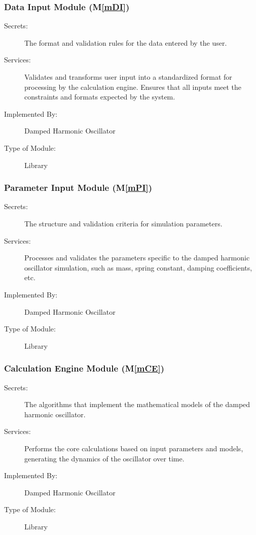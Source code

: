 \documentclass[12pt, titlepage]{article}
\newcommand{\mref}[1]{M\ref{#1}}
\begin{document}
\subsubsection{Data Input Module (\mref{mDI})}

\begin{description}
\item[Secrets:]The format and validation rules for the data entered by the user.
\item[Services:]Validates and transforms user input into a standardized format for processing by the calculation engine. Ensures that all inputs meet the constraints and formats expected by the system.
\item[Implemented By:] Damped Harmonic Oscillator
\item[Type of Module:] Library
\end{description}

\subsubsection{Parameter Input Module (\mref{mPI})}

\begin{description}
\item[Secrets:]The structure and validation criteria for simulation parameters.
\item[Services:]Processes and validates the parameters specific to the damped harmonic oscillator simulation, such as mass, spring constant, damping coefficients, etc.
\item[Implemented By:] Damped Harmonic Oscillator
\item[Type of Module:] Library
\end{description}

\subsubsection{Calculation Engine Module (\mref{mCE})}

\begin{description}
\item[Secrets:]The algorithms that implement the mathematical models of the damped harmonic oscillator.
\item[Services:]Performs the core calculations based on input parameters and models, generating the dynamics of the oscillator over time.
\item[Implemented By:] Damped Harmonic Oscillator
\item[Type of Module:] Library
\end{description}
\end{document}
